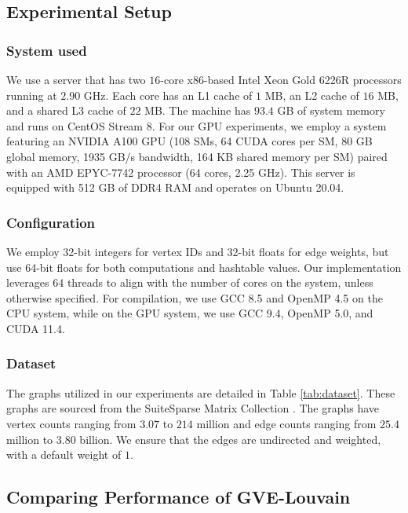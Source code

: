 \subsection{Experimental Setup}
\label{sec:setup}

\subsubsection{System used}

We use a server that has two $16$-core x86-based Intel Xeon Gold 6226R processors running at $2.90$ GHz. Each core has an L1 cache of $1$ MB, an L2 cache of $16$ MB, and a shared L3 cache of $22$ MB. The machine has $93.4$ GB of system memory and runs on CentOS Stream 8. For our GPU experiments, we employ a system featuring an NVIDIA A100 GPU (108 SMs, 64 CUDA cores per SM, 80 GB global memory, 1935 GB/s bandwidth, 164 KB shared memory per SM) paired with an AMD EPYC-7742 processor (64 cores, 2.25 GHz). This server is equipped with 512 GB of DDR4 RAM and operates on Ubuntu 20.04.


\subsubsection{Configuration}

We employ 32-bit integers for vertex IDs and 32-bit floats for edge weights, but use 64-bit floats for both computations and hashtable values. Our implementation leverages $64$ threads to align with the number of cores on the system, unless otherwise specified. For compilation, we use GCC 8.5 and OpenMP 4.5 on the CPU system, while on the GPU system, we use GCC 9.4, OpenMP 5.0, and CUDA 11.4.


\subsubsection{Dataset}

The graphs utilized in our experiments are detailed in Table \ref{tab:dataset}. These graphs are sourced from the SuiteSparse Matrix Collection \cite{suite19}. The graphs have vertex counts ranging from $3.07$ to $214$ million and edge counts ranging from $25.4$ million to $3.80$ billion. We ensure that the edges are undirected and weighted, with a default weight of $1$.







\subsection{Comparing Performance of GVE-Louvain}
\label{sec:comparison}

